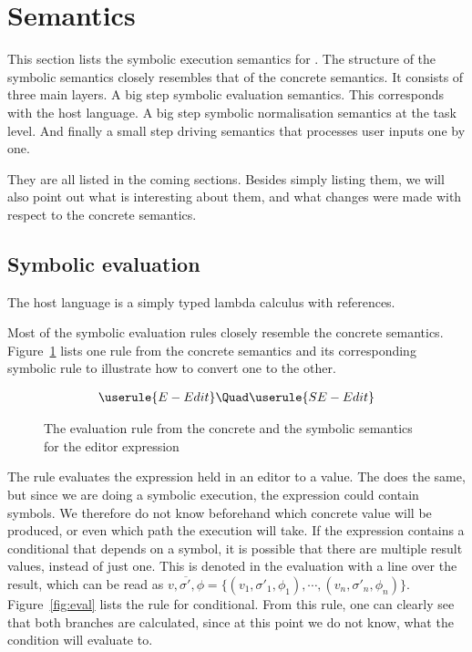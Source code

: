 

\section{Semantics}
\label{sec:semantics}

This section lists the symbolic execution semantics for \TOPHAT.
The structure of the symbolic semantics closely resembles that of the concrete semantics.
It consists of three main layers.
A big step symbolic evaluation semantics.
This corresponds with the host language.
A big step symbolic normalisation semantics at the task level.
And finally a small step driving semantics that processes user inputs one by one.

They are all listed in the coming sections.
Besides simply listing them, we will also point out what is interesting about them,
and what changes were made with respect to the concrete semantics.

\subsection{Symbolic evaluation}

The host language is a simply typed lambda calculus with references.

Most of the symbolic evaluation rules closely resemble the concrete semantics.
Figure~\ref{fig:oldToNewSemantics} lists one rule from the concrete semantics and its corresponding symbolic rule to illustrate how to convert one to the other.

\begin{figure}[h]
  \small
  \begin{gather*}
    \userule{E-Edit}\Quad
    \userule{SE-Edit}
  \end{gather*}
  \caption{The evaluation rule from the concrete and the symbolic semantics for the editor expression}
  \label{fig:oldToNewSemantics}
\end{figure}

The  rule evaluates the expression held in an editor to a value.
The  does the same, but since we are doing a symbolic execution, the expression could contain symbols.
We therefore do not know beforehand which concrete value will be produced, or even which path the execution will take.
If the expression contains a conditional that depends on a symbol, it is possible that there are multiple result values, instead of just one.
This is denoted in the evaluation with a line over the result, which can be read as $\overline{v,\sigma',\phi} = \{(v_1,\sigma'_1,\phi_1),\cdots,(v_n,\sigma'_n,\phi_n)\}$.
Figure~\ref{fig:eval} lists the rule for conditional.
From this rule, one can clearly see that both branches are calculated, since at this point we do not know, what the condition will evaluate to.

